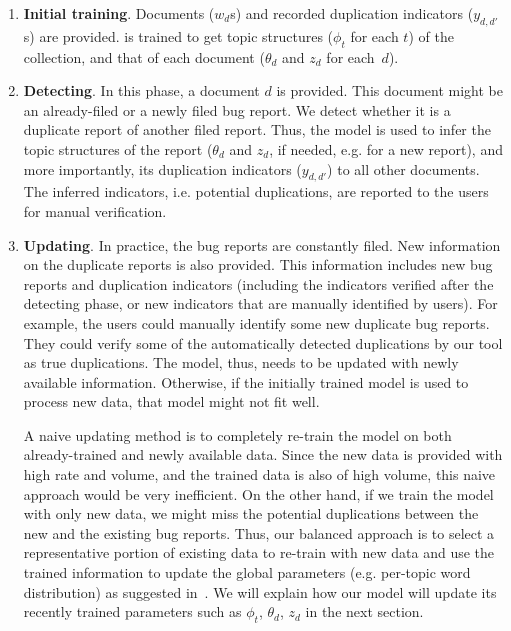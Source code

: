 \begin{enumerate}

\item {\bf Initial training}.  Documents ($w_d$s) and recorded
duplication indicators ($y_{d,d'}$s) are provided. {\model} is
trained to get topic structures ($\phi_t$ for each $t$) of the
collection, and that of each document ($\theta_d$ and $z_d$ for
each~$d$).

\item {\bf Detecting}.  In this phase, a document $d$ is provided. This
document might be an already-filed or a newly filed bug report. We
detect whether it is a duplicate report of another filed report. Thus,
the model is used to infer the topic structures of the report
($\theta_d$ and $z_d$, if needed, e.g. for a new report), and more
importantly, its duplication indicators ($y_{d,d'}$) to all other
documents. The inferred indicators, i.e. potential duplications, are
reported to the users for manual verification.

\item {\bf Updating}.
In practice, the bug reports are constantly filed. New information on
the duplicate reports is also provided.  This information includes new
bug reports and duplication indicators (including the indicators
verified after the detecting phase, or new indicators that are
manually identified by users). For example, the users could manually
identify some new duplicate bug reports. They could verify some of the
automatically detected duplications by our tool as true
duplications. The model, thus, needs to be updated with newly
available information. Otherwise, if the initially trained model is
used to process new data, that model might not fit well.

A naive updating method is to completely re-train the model on both
already-trained and newly available data. Since the new data is
provided with high rate and volume, and the trained data is also of
high volume, this naive approach would be very inefficient. On the
other hand, if we train the model with only new data, we might miss
the potential duplications between the new and the existing bug
reports. Thus, our balanced approach is to select a representative
portion of existing data to re-train with new data and use the trained
information to update the global parameters (e.g. per-topic word
distribution) as suggested in~\cite{canini09}. We will explain how our
model {\model} will update its recently trained parameters such as
$\phi_t$, $\theta_d$, $z_d$ in the next section.

\end{enumerate}

